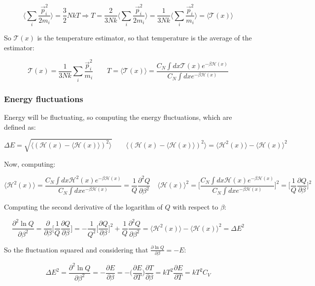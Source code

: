 	$$\biggl\langle\sum\limits_{i}\frac{\vec{p}_i^2}{2m_i}\biggr\rangle = \frac{3}{2}NkT\Rightarrow T = \frac{2}{3Nk}\biggl\langle\sum\limits_i\frac{\vec{p}_i^2}{2m_i}\biggr\rangle = \frac{1}{3Nk}\biggl\langle\sum\limits_i\frac{\vec{p}_i^2}{m_i}\biggr\rangle = \langle\mathcal{T}(x)\rangle$$

	So $\mathcal{T}(x)$ is the temperature estimator, so that temperature is the average of the estimator:

	$$\mathcal{T}(x) = \frac{1}{3Nk}\sum\limits_i\frac{\vec{p}_i^2}{m_i}\qquad T = \langle\mathcal{T}(x)\rangle = \frac{C_N\int dx\mathcal{T}(x)e^{-\beta\mathcal{H}(x)}}{C_N\int dx e^{-\beta\mathcal{H}(x)}}$$

		\subsubsection{Energy fluctuations}
		Energy will be fluctuating, so computing the energy fluctuations, which are defined as:

		$$\Delta E = \sqrt{\langle(\mathcal{H}(x)-\langle\mathcal{H}(x)\rangle)^2\rangle}\qquad \langle(\mathcal{H}(x)-\langle\mathcal{H}(x)\rangle)^2\rangle = \langle\mathcal{H}^2(x)\rangle - \langle\mathcal{H}(x)\rangle^2$$

		Now, computing:

		$$\langle\mathcal{H}^2(x)\rangle = \frac{C_N\int dx\mathcal{H}^2(x)e^{-\beta\mathcal{H}(x)}}{C_N\int dxe^{-\beta\mathcal{H}(x)}} = \frac{1}{Q}\frac{\partial^2 Q}{\partial \beta^2}\quad\langle\mathcal{H}(x)\rangle^2 = \biggl[\frac{C_N\int dx\mathcal{H}(x)e^{-\beta\mathcal{H}(x)}}{C_N\int dx e^{-\beta\mathcal{H}(x)}}\biggr]^2 = \biggl[\frac{1}{Q}\frac{\partial Q}{\partial\beta}\biggr]^2$$

		Computing the second derivative of the logarithm of $Q$ with respect to $\beta$:

		$$\frac{\partial^2\ln Q}{\partial \beta^2} = \frac{\partial}{\partial\beta}\biggl[\frac{1}{Q}\frac{\partial Q}{\partial\beta}\biggr] = -\frac{1}{Q^2}\biggl[\frac{\partial Q}{\partial\beta}\biggr]^2 + \frac{1}{Q}\frac{\partial^2 Q}{\partial\beta^2} = \langle\mathcal{H}^2(x)\rangle-\langle\mathcal{H}(x)\rangle^2 = \Delta E^2$$

		So the fluctuation squared and considering that $\frac{\partial\ln Q}{\partial\beta} = -E$:

		$$\Delta E^2 = \frac{\partial^2\ln Q}{\partial\beta^2} = -\frac{\partial E}{\partial\beta} = -\biggl(\frac{\partial E}{\partial T}\biggr)\frac{\partial T}{\partial\beta} = kT^2\frac{\partial E}{\partial T} = kT^2C_V$$

